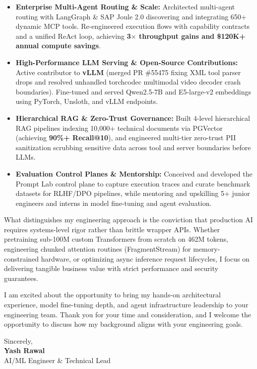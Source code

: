 \documentclass[letterpaper,11pt]{article}
\begin{document}
\begin{itemize}[leftmargin=0.2in, itemsep=3pt]
    \item \textbf{Enterprise Multi-Agent Routing \& Scale:} Architected multi-agent routing with LangGraph \& SAP Joule 2.0 discovering and integrating 650+ dynamic MCP tools. Re-engineered execution flows with capability contracts and a unified ReAct loop, achieving \textbf{3$\times$ throughput gains and \$120K+ annual compute savings}.
    \item \textbf{High-Performance LLM Serving \& Open-Source Contributions:} Active contributor to \textbf{vLLM} (merged PR \#55475 fixing XML tool parser drops and resolved unhandled torchcodec multimodal video decoder crash boundaries). Fine-tuned and served Qwen2.5-7B and E5-large-v2 embeddings using PyTorch, Unsloth, and vLLM endpoints.
    \item \textbf{Hierarchical RAG \& Zero-Trust Governance:} Built 4-level hierarchical RAG pipelines indexing 10,000+ technical documents via PGVector (achieving \textbf{90\%+ Recall@10}), and engineered multi-tier zero-trust PII sanitization scrubbing sensitive data across tool and server boundaries before LLMs.
    \item \textbf{Evaluation Control Planes \& Mentorship:} Conceived and developed the Prompt Lab control plane to capture execution traces and curate benchmark datasets for RLHF/DPO pipelines, while mentoring and upskilling 5+ junior engineers and interns in model fine-tuning and agent evaluation.
\end{itemize}

\vspace{4pt}
What distinguishes my engineering approach is the conviction that production AI requires systems-level rigor rather than brittle wrapper APIs. Whether pretraining sub-100M custom Transformers from scratch on 462M tokens, engineering chunked attention routines (FragmentStream) for memory-constrained hardware, or optimizing async inference request lifecycles, I focus on delivering tangible business value with strict performance and security guarantees.

\vspace{6pt}
I am excited about the opportunity to bring my hands-on architectural experience, model fine-tuning depth, and agent infrastructure leadership to your engineering team. Thank you for your time and consideration, and I welcome the opportunity to discuss how my background aligns with your engineering goals.

\vspace{12pt}
\noindent Sincerely, \\ \vspace{4pt}
\textbf{Yash Rawal} \\
\small AI/ML Engineer \& Technical Lead
\end{document}
